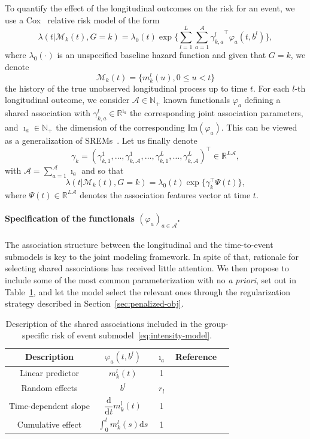 \documentclass[11pt]{article}
\newcommand{\dd}{\mathrm{d}}
\newcommand{\cM}{\mathcal M}
\newcommand{\cA}{\mathcal A}
\newcommand{\sA}{\mathscr A}
\newcommand{\R}{\mathds R}
\newcommand{\N}{\mathds N}
\begin{document}
To quantify the effect of the longitudinal outcomes on the risk for an event, we use a Cox~\citep{Cox1972JRSS} relative risk model of the form
\begin{equation}
	\label{eq:intensity-model}
	\lambda(t|\cM_k(t), G = k) = \lambda_0(t) \exp \Big\{\sum_{l=1}^L \sum_{a=1}^\cA {\gamma_{k,a}^l}^\top \varphi_a(t, b^l) \Big\},
\end{equation}
where $\lambda_0(\cdot)$ is an unspecified baseline hazard function and given that $G = k$, we denote 
\[\cM_k(t) = \{m_k^l(u), 0 \leq u < t\}\] 
the history of the true unobserved longitudinal process up to time $t$. For each $l$-th longitudinal outcome, we consider $\cA \in \N_+$ known functionals $\varphi_a$ defining a shared association with $\gamma_{k,a}^l \in \R^{\imath_a}$ the corresponding joint association parameters, and $\imath_a \in \N_+$ the dimension of the corresponding $\text{Im}(\varphi_a)$.
This can be viewed as a generalization of SREMs~\citep{rizopoulos2010jm}. Let us finally denote
\[\gamma_k= (\gamma_{k,1}^1, \ldots, \gamma_{k,\cA}^1, \ldots, \gamma_{k,1}^L, \ldots, \gamma_{k,\cA}^L )^\top \in \R^{L\sA}, \] with $\sA = \sum_{a=1}^\cA \imath_a$ and so that
\begin{equation}
  \label{eq:def-asso-features}
  \lambda(t|\cM_k(t), G = k) = \lambda_0(t) \exp \big\{\gamma_k^\top \Psi(t) \big\},
\end{equation}
where $\Psi(t) \in \R^{L\sA}$ denotes the association features vector at time $t$.

\paragraph{Specification of the functionals $(\varphi_a)_{a\in \cA}$.}

The association structure between the longitudinal and the time-to-event submodels is key to the joint modeling framework. In spite of that, rationale for selecting shared associations has received little attention. We then propose to include some of the most common parameterization with no \textit{a priori}, set out in Table~\ref{table:shared_associations}, and let the model select the relevant ones through the regularization strategy described in Section~\ref{sec:penalized-obj}.
\begin{table}[htb]
\centering
\begin{tabular}{ccccc}
\toprule
Description & $\varphi_a(t, b^l)$ & $\imath_a$ & Reference \\
\midrule
Linear predictor & $m_k^l(t)$ & 1 & \citet{chi2006joint} \\ [.15cm]
Random effects & $b^l$ & $r_l$ & \citet{hatfield2011joint} \\
Time-dependent slope & $\dfrac{\dd}{\dd t} m_k^l(t)$ & 1 & \citet{rizopoulos2011bayesian} \\ [.3cm]
Cumulative effect & $\int_0^t m_k^l(s) \dd s$ & 1 & \citet{andrinopoulou2017combined} \\ [.1cm]
 \bottomrule
\end{tabular}
\caption[]{Description of the shared associations included in the group-specific risk of event submodel~\eqref{eq:intensity-model}.}
\label{table:shared_associations}
\end{table}
\end{document}
